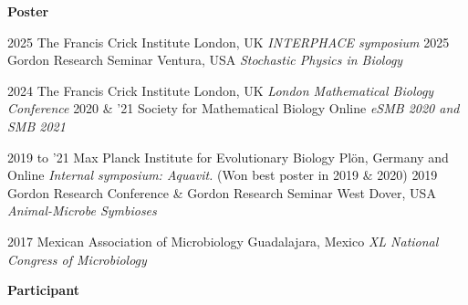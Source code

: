 \documentclass[]{friggeri-cv} %
\begin{document}
\textbf{Poster}

\begin{entrylist}
\entry
{2025}
{}
{The Francis Crick Institute}
{London, UK}
{{\normalsize\emph{INTERPHACE symposium}}}
{\vspace{-3mm}}
\entry
{2025}
{}
{Gordon Research Seminar}
{Ventura, USA}
{{\normalsize\emph{Stochastic Physics in Biology}}}
{\vspace{-3mm}}
\end{entrylist}
\begin{entrylist}
\entry
{2024}
{}
{The Francis Crick Institute}
{London, UK}
{{\normalsize\emph{London Mathematical Biology Conference}}}
{\vspace{-3mm}}
\entry
{2020 \& '21}
{}%
{Society for Mathematical Biology}
{Online}
{{\normalsize\emph{eSMB 2020 and SMB 2021}}}
{\vspace{-3mm}}
\end{entrylist}
\begin{entrylist}
\entry
{2019 to '21}
{}%
{Max Planck Institute for Evolutionary Biology}
{Plön, Germany and Online}
{{\normalsize\emph{Internal symposium: Aquavit.} (Won best poster in 2019 \& 2020)}}
{\vspace{-3mm}}
\entry
{2019}
{}%
{Gordon Research Conference \& Gordon Research Seminar}
{West Dover, USA}
{{\normalsize\emph{Animal-Microbe Symbioses}}}
{\vspace{-3mm}}
\end{entrylist}
\begin{entrylist}
\entry
{2017}
{}%
{Mexican Association of Microbiology}
{Guadalajara, Mexico}
{{\normalsize\emph{XL National Congress of Microbiology}}}
{\vspace{-3mm}}
\end{entrylist}

\textbf{Participant}
\end{document}
